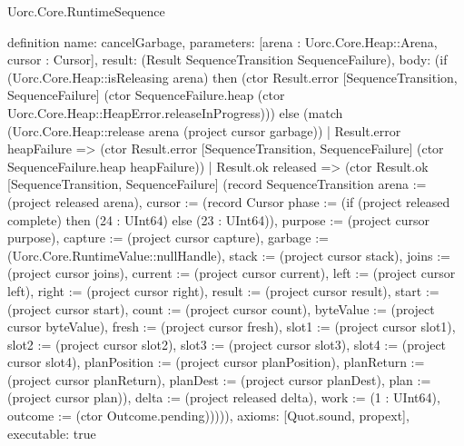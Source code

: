 \begin{lexlean}{Uorc.Core.RuntimeSequence}
\begin{semanticmodule}
definition{
  name: cancelGarbage,
  parameters: [arena : Uorc.Core.Heap::Arena, cursor : Cursor],
  result: (Result SequenceTransition SequenceFailure),
  body: (if (Uorc.Core.Heap::isReleasing arena) then (ctor Result.error [SequenceTransition, SequenceFailure] (ctor SequenceFailure.heap (ctor Uorc.Core.Heap::HeapError.releaseInProgress))) else (match (Uorc.Core.Heap::release arena (project cursor garbage))
    | Result.error heapFailure => (ctor Result.error [SequenceTransition, SequenceFailure] (ctor SequenceFailure.heap heapFailure))
    | Result.ok released => (ctor Result.ok [SequenceTransition, SequenceFailure] (record SequenceTransition {arena := (project released arena), cursor := (record Cursor {phase := (if (project released complete) then (24 : UInt64) else (23 : UInt64)), purpose := (project cursor purpose), capture := (project cursor capture), garbage := (Uorc.Core.RuntimeValue::nullHandle), stack := (project cursor stack), joins := (project cursor joins), current := (project cursor current), left := (project cursor left), right := (project cursor right), result := (project cursor result), start := (project cursor start), count := (project cursor count), byteValue := (project cursor byteValue), fresh := (project cursor fresh), slot1 := (project cursor slot1), slot2 := (project cursor slot2), slot3 := (project cursor slot3), slot4 := (project cursor slot4), planPosition := (project cursor planPosition), planReturn := (project cursor planReturn), planDest := (project cursor planDest), plan := (project cursor plan)}), delta := (project released delta), work := (1 : UInt64), outcome := (ctor Outcome.pending)})))),
  axioms: [Quot.sound, propext],
  executable: true
}


\end{semanticmodule}
\end{lexlean}
